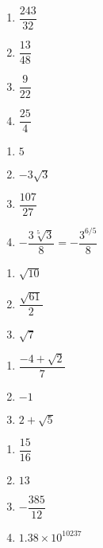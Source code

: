 \begin{multicols}{4}
\begin{enumerate}
\setcounter{enumi}{\value{HW}}

\item  $\dfrac{243}{32}$
\item  $\dfrac{13}{48}$
\item  $\dfrac{9}{22}$
\item  $\dfrac{25}{4}$

\setcounter{HW}{\value{enumi}}
\end{enumerate}
\end{multicols}

\begin{multicols}{4}
\begin{enumerate}
\setcounter{enumi}{\value{HW}}

\item  $5$ 
\item  $-3\sqrt{3}$ 
\item  $\dfrac{107}{27}$
\item  $-\dfrac{3\sqrt[5]{3}}{8} = -\dfrac{3^{6/5}}{8}$

\setcounter{HW}{\value{enumi}}
\end{enumerate}
\end{multicols}


\begin{multicols}{3}
\begin{enumerate}
\setcounter{enumi}{\value{HW}}

\item  $\sqrt{10}$
\item  $\dfrac{\sqrt{61}}{2}$ 
\item  $\sqrt{7}$

\setcounter{HW}{\value{enumi}}
\end{enumerate}
\end{multicols}

\begin{multicols}{3}
\begin{enumerate}
\setcounter{enumi}{\value{HW}}

\item  $\dfrac{-4 + \sqrt{2}}{7}$
\item  $-1$
\item  $2 + \sqrt{5}$

\setcounter{HW}{\value{enumi}}
\end{enumerate}
\end{multicols}

\begin{multicols}{4}
\begin{enumerate}
\setcounter{enumi}{\value{HW}}

\item $\dfrac{15}{16}$
\item $13$
\item $-\dfrac{385}{12}$

\item $1.38 \times 10^{10237}$
\end{enumerate}
\end{multicols}